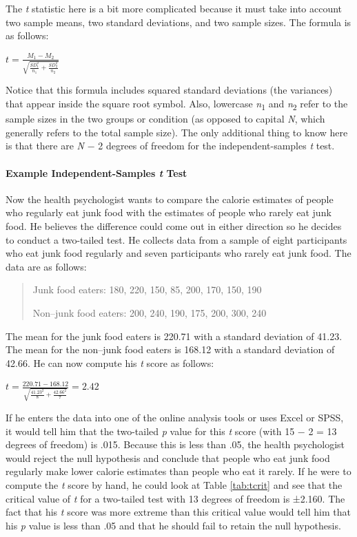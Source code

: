 \documentclass[
]{krantz}
\begin{document}
The \emph{t} statistic here is a bit more complicated because it must take into account two sample means, two standard deviations, and two sample sizes. The formula is as follows:

\(t=\frac{M_1-M_2}{\sqrt{\frac{SD_1^2}{n_1}+\frac{SD_2^2}{n_2}}}\)

Notice that this formula includes squared standard deviations (the variances) that appear inside the square root symbol. Also, lowercase \emph{n}\textsubscript{1} and \emph{n}\textsubscript{2} refer to the sample sizes in the two groups or condition (as opposed to capital \emph{N}, which generally refers to the total sample size). The only additional thing to know here is that there are \emph{N} − 2 degrees of freedom for the independent-samples \emph{t} test.

\paragraph*{\texorpdfstring{Example Independent-Samples \emph{t} Test}{Example Independent-Samples t Test}}\label{example-independent-samples-t-test}

Now the health psychologist wants to compare the calorie estimates of people who regularly eat junk food with the estimates of people who rarely eat junk food. He believes the difference could come out in either direction so he decides to conduct a two-tailed test. He collects data from a sample of eight participants who eat junk food regularly and seven participants who rarely eat junk food. The data are as follows:

\begin{quote}
Junk food eaters: 180, 220, 150, 85, 200, 170, 150, 190

Non--junk food eaters: 200, 240, 190, 175, 200, 300, 240
\end{quote}

The mean for the junk food eaters is 220.71 with a standard deviation of 41.23. The mean for the non--junk food eaters is 168.12 with a standard deviation of 42.66. He can now compute his \emph{t} score as follows:

\(t=\frac{220.71-168.12}{\sqrt{\frac{41.23^2}{8}+\frac{42.66^2}{7}}}=2.42\)

If he enters the data into one of the online analysis tools or uses Excel or SPSS, it would tell him that the two-tailed \emph{p} value for this \emph{t} score (with 15 − 2 = 13 degrees of freedom) is .015. Because this is less than .05, the health psychologist would reject the null hypothesis and conclude that people who eat junk food regularly make lower calorie estimates than people who eat it rarely. If he were to compute the \emph{t} score by hand, he could look at Table \ref{tab:tcrit} and see that the critical value of \emph{t} for a two-tailed test with 13 degrees of freedom is ±2.160. The fact that his \emph{t} score was more extreme than this critical value would tell him that his \emph{p} value is less than .05 and that he should fail to retain the null hypothesis.
\end{document}
